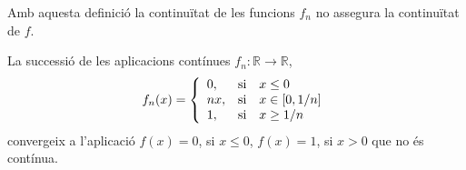\documentclass[../main.tex]{subfiles}
\begin{document}
\begin{nota}
Amb aquesta definició la continuïtat de les funcions $f_n$ no assegura la continuïtat de $f$.
\end{nota}

\begin{ej}
La successió de les aplicacions contínues $f_n:\mathbb{R}\rightarrow\mathbb{R}$,
\begin{equation}
    \notag
    f_n(x) = \left\{
    \begin{array}{ll}
        0,& \text{si}\quad x\leq 0 \\
        nx, & \text{si} \quad x\in [0,1/n]\\
        1, & \text{si} \quad x\geq 1/n
    \end{array}
    \right.
\end{equation}
convergeix a l'aplicació $f(x) = 0$, si $x\leq 0$, $f(x) = 1$, si $x>0$ que no és contínua.
\end{ej}
\end{document}
